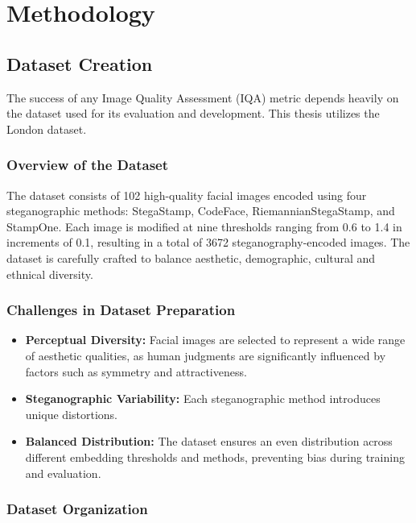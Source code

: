 \chapter{Methodology}

\section{Dataset Creation}

The success of any Image Quality Assessment (IQA) metric depends heavily on the dataset used for its evaluation and development. This thesis utilizes the London dataset.

\subsection{Overview of the Dataset}

The dataset consists of 102 high-quality facial images encoded using four steganographic methods: StegaStamp, CodeFace, RiemannianStegaStamp, and StampOne. Each image is modified at nine thresholds ranging from 0.6 to 1.4 in increments of 0.1, resulting in a total of 3672 steganography-encoded images. The dataset is carefully crafted to balance aesthetic, demographic, cultural and ethnical diversity.

\subsection{Challenges in Dataset Preparation}

\begin{itemize}
    \item \textbf{Perceptual Diversity:} Facial images are selected to represent a wide range of aesthetic qualities, as human judgments are significantly influenced by factors such as symmetry and attractiveness.
    \item \textbf{Steganographic Variability:} Each steganographic method introduces unique distortions.
    \item \textbf{Balanced Distribution:} The dataset ensures an even distribution across different embedding thresholds and methods, preventing bias during training and evaluation.
\end{itemize}

\subsection{Dataset Organization}

